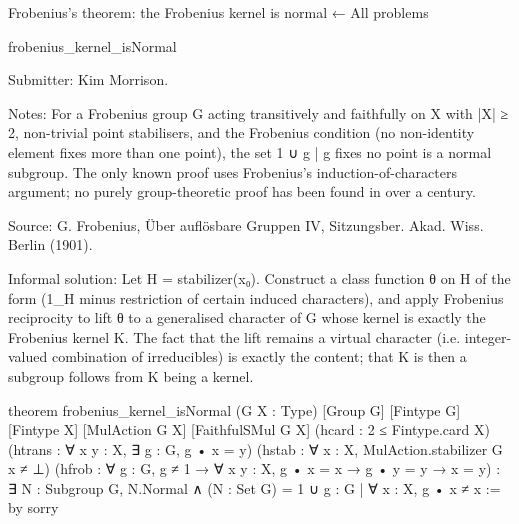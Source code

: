 Frobenius's theorem: the Frobenius kernel is normal
← All problems

frobenius_kernel_isNormal

Submitter: Kim Morrison.

Notes: For a Frobenius group G acting transitively and faithfully on X with |X| ≥ 2, non-trivial point stabilisers, and the Frobenius condition (no non-identity element fixes more than one point), the set {1} ∪ {g | g fixes no point} is a normal subgroup. The only known proof uses Frobenius's induction-of-characters argument; no purely group-theoretic proof has been found in over a century.

Source: G. Frobenius, Über auflösbare Gruppen IV, Sitzungsber. Akad. Wiss. Berlin (1901).

Informal solution: Let H = stabilizer(x₀). Construct a class function θ on H of the form (1_H minus restriction of certain induced characters), and apply Frobenius reciprocity to lift θ to a generalised character of G whose kernel is exactly the Frobenius kernel K. The fact that the lift remains a virtual character (i.e. integer-valued combination of irreducibles) is exactly the content; that K is then a subgroup follows from K being a kernel.

theorem frobenius_kernel_isNormal (G X : Type) [Group G] [Fintype G] [Fintype X]
    [MulAction G X] [FaithfulSMul G X]
    (hcard : 2 ≤ Fintype.card X)
    (htrans : ∀ x y : X, ∃ g : G, g • x = y)
    (hstab : ∀ x : X, MulAction.stabilizer G x ≠ ⊥)
    (hfrob : ∀ g : G, g ≠ 1 → ∀ x y : X, g • x = x → g • y = y → x = y) :
    ∃ N : Subgroup G, N.Normal ∧
      (N : Set G) = {1} ∪ {g : G | ∀ x : X, g • x ≠ x} := by
  sorry